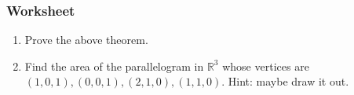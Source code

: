 \documentclass[aspectratio=169]{beamer}
\begin{document}
\begin{frame}
    \frametitle{Worksheet}
    \begin{enumerate}
        \item Prove the above theorem.
        \item Find the area of the parallelogram in $\mathbb{R}^3$ whose
            vertices are $(1,0,1), (0,0,1), (2,1,0), (1,1,0)$.
            Hint: maybe draw it out.
    \end{enumerate}
\end{frame}
\end{document}
